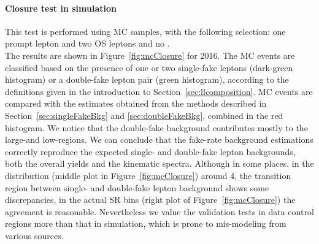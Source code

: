 \paragraph{Closure test in simulation}
This test is performed using \ttbar MC samples, with the
following selection: one prompt lepton and two OS \displ leptons and no \PQb.\\
The results are shown in Figure~\ref{fig:mcClosure} for 2016. The MC
events are 
classified based on the presence of one or two single-fake leptons
(dark-green histogram) or a double-fake lepton pair (green histogram),
according to the definitions given in the introduction to
Section~\ref{sec:llcomposition}. MC events are compared with the estimates
obtained from the \fr methods described in
Section~\ref{sec:singleFakeBkg}
and \ref{sec:doubleFakeBkg}, combined in the red histogram.
We notice that the double-fake background contributes mostly to
the large-\Deltwod and low-\mtwol regions. We can conclude that the
fake-rate background estimations correctly reproduce the expected
single- and double-fake lepton backgrounds, both the overall yields and the
kinematic spectra. 
Although in some places, \eg in the \mtwol distribution
(middle plot in Figure~\ref{fig:mcClosure}) around 4\GeV, the transition region between
single- and double-fake lepton background shows some discrepancies, in the
actual SR bins (right plot of Figure~\ref{fig:mcClosure}) the agreement is
reasonable. Nevertheless we value the validation tests in data
control regions more than that in simulation, which is prone to
mis-modeling from various sources. \\
